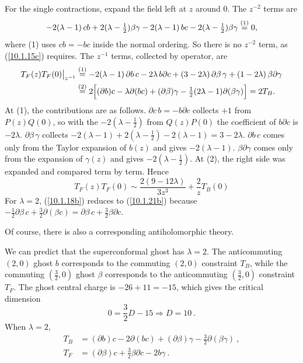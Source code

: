 \begin{tcolorbox}[breakable]
\begin{remark}
		For the single contractions, expand the field left at $z$ around $0$. The $z^{-2}$ terms are
		\begin{equation*}
			-2(\lambda-1)\,cb+2(\lambda-\tfrac12)\beta\gamma-2(\lambda-1)\,bc-2(\lambda-\tfrac12)\beta\gamma\overset{(1)}{=}0 ,
		\end{equation*}
		where (1) uses $cb=-bc$ inside the normal ordering. So there is no $z^{-2}$ term, as (\ref{10.1.15c}) requires. The $z^{-1}$ terms, collected by operator, are
		\begin{align*}
			T_F(z)T_F(0)\big|_{z^{-1}}&\overset{(1)}{=}-2(\lambda-1)\,\partial b\,c-2\lambda\,b\partial c+(3-2\lambda)\,\partial\beta\,\gamma+(1-2\lambda)\,\beta\partial\gamma\\
			&\overset{(2)}{=}2\Bigl[(\partial b)c-\lambda\partial(bc)+(\partial\beta)\gamma-\tfrac12(2\lambda-1)\partial(\beta\gamma)\Bigr]=2T_B .
		\end{align*}
		At (1), the contributions are as follows. $\partial c\,b=-b\partial c$ collects $+1$ from $P(z)Q(0)$, so with the $-2(\lambda-\tfrac12)$ from $Q(z)P(0)$ the coefficient of $b\partial c$ is $-2\lambda$. $\partial\beta\,\gamma$ collects $-2(\lambda-1)+2(\lambda-\tfrac12)-2(\lambda-1)=3-2\lambda$. $\partial b\,c$ comes only from the Taylor expansion of $b(z)$ and gives $-2(\lambda-1)$. $\beta\partial\gamma$ comes only from the expansion of $\gamma(z)$ and gives $-2(\lambda-\tfrac12)$. At (2), the right side was expanded and compared term by term. Hence
		\begin{equation*}
			\boxed{T_F(z)T_F(0)\sim\frac{2(9-12\lambda)}{3z^{3}}+\frac{2}{z}T_B(0)}
		\end{equation*}
		For $\lambda=2$, (\ref{10.1.18b}) reduces to (\ref{10.1.21b}) because $-\tfrac12\partial\beta\,c+\tfrac32\partial(\beta c)=\partial\beta\,c+\tfrac32\beta\partial c$.
	\end{remark}
\end{tcolorbox}
Of course, there is also a corresponding antiholomorphic theory.

We can predict that the superconformal ghost has $\lambda=2$. The anticommuting $(2,0)$ ghost $b$ corresponds to the commuting $(2,0)$ constraint $T_{B}$, while the commuting $(\frac{3}{2},0)$ ghost $\beta$ corresponds to the anticommuting $(\frac{3}{2},0)$ constraint $T_{F}$. The ghost central charge is $-26+11=-15$, which gives the critical dimension
\begin{equation}
	0=\frac{3}{2}D-15 \Rightarrow D=10\:.\label{10.1.20}
\end{equation}
When $\lambda=2$,
\begin{subequations}
	\begin{align}
		T_{B}&=(\partial b)c-2\partial(bc)+(\partial \beta)\gamma-\frac{3}{2}\partial(\beta\gamma)\:,
		\label{10.1.21a} \\
		T_{F}&=(\partial \beta)c+ \frac{3}{2}\beta\partial c - 2b\gamma\:.\label{10.1.21b}
	\end{align}
\end{subequations}

